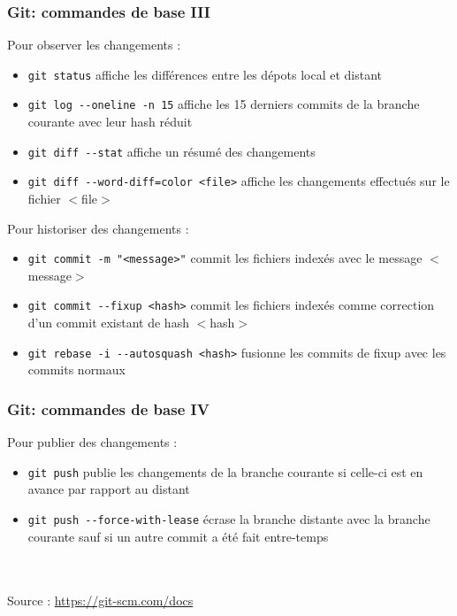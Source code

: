 \begin{frame}
	\frametitle{Git: commandes de base III}
	Pour observer les changements :
    \begin{itemize}
	  \item {\lstinline[basicstyle=\ttfamily\color{blue}]|git status|} affiche les diff\'erences entre les d\'epots local et distant
      \item {\lstinline[basicstyle=\ttfamily\color{blue}]|git log --oneline -n 15|} affiche les 15 derniers commits de la branche courante avec leur hash r\'eduit
	  \item {\lstinline[basicstyle=\ttfamily\color{blue}]|git diff --stat|} affiche un r\'esum\'e des changements
      \item {\lstinline[basicstyle=\ttfamily\color{blue}]|git diff --word-diff=color <file>|} affiche les changements effectu\'es sur le fichier $<$file$>$
    \end{itemize}
	Pour historiser des changements :
	\begin{itemize}
      \item {\lstinline[basicstyle=\ttfamily\color{blue}]|git commit -m "<message>"|} commit les fichiers index\'es avec le message $<$message$>$
      \item {\lstinline[basicstyle=\ttfamily\color{blue}]|git commit --fixup <hash>|} commit les fichiers index\'es comme correction d'un commit existant de hash $<$hash$>$
	  \item {\lstinline[basicstyle=\ttfamily\color{blue}]|git rebase -i --autosquash <hash>|} fusionne les commits de fixup avec les commits normaux
    \end{itemize}
\end{frame}

\begin{frame}
	\frametitle{Git: commandes de base IV}
	Pour publier des changements :
	\begin{itemize}
      \item {\lstinline[basicstyle=\ttfamily\color{blue}]|git push|} publie les changements de la branche courante si celle-ci est en avance par rapport au distant
      \item {\lstinline[basicstyle=\ttfamily\color{blue}]|git push --force-with-lease|} \'ecrase la branche distante avec la branche courante sauf si un autre commit a \'et\'e fait entre-temps
    \end{itemize}
	
	~\\~\\

	Source : \url{https://git-scm.com/docs}
\end{frame}

